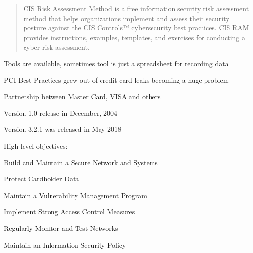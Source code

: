 \documentclass[Screen16to9,17pt]{foils}
\begin{document}

\begin{quote}
CIS Risk Assessment Method is a free information security risk assessment method that helps organizations implement and assess their security posture against the CIS Controls™ cybersecurity best practices. CIS RAM provides instructions, examples, templates, and exercises for conducting a cyber risk assessment.
\end{quote}

\begin{list1}
\item Tools are available, sometimes tool is just a spreadsheet for recording data
\item
\item
\item
\end{list1}







\begin{list1}
\item PCI Best Practices grew out of credit card leaks becoming a huge problem
\item Partnership between Master Card, VISA and others
\item Version  1.0 release in December, 2004
\item Version 3.2.1 was released in May 2018\\ 
\end{list1}




\begin{list1}
\item High level objectives:
\begin{list2}
\item Build and Maintain a Secure Network and Systems
\item Protect Cardholder Data
\item Maintain a Vulnerability Management Program
\item Implement Strong Access Control Measures
\item Regularly Monitor and Test Networks
\item Maintain an Information Security Policy
\end{list2}
\end{list1}
\end{document}
